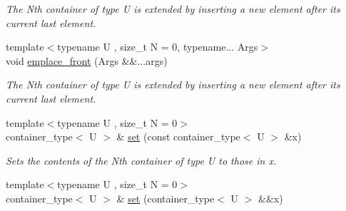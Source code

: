 \begin{DoxyCompactItemize}
\begin{DoxyCompactList}\small\item\em The Nth container of type U is extended by inserting a new element after its current last element. \end{DoxyCompactList}\item 
\hypertarget{classheterogeneous_1_1heterodeque_3_01_t_00_01_types_8_8_8_4_ac23d7efd5678583441800bb516d9db53}{}{\footnotesize template$<$typename U , size\+\_\+t N = 0, typename... Args$>$ }\\void \hyperlink{classheterogeneous_1_1heterodeque_3_01_t_00_01_types_8_8_8_4_ac23d7efd5678583441800bb516d9db53}{emplace\+\_\+front} (Args \&\&...args)\label{classheterogeneous_1_1heterodeque_3_01_t_00_01_types_8_8_8_4_ac23d7efd5678583441800bb516d9db53}

\begin{DoxyCompactList}\small\item\em The Nth container of type U is extended by inserting a new element after its current last element. \end{DoxyCompactList}\item 
\hypertarget{classheterogeneous_1_1heterodeque_3_01_t_00_01_types_8_8_8_4_aa7d6d0f4a15a6f2a9d302b8e7727cf3a}{}{\footnotesize template$<$typename U , size\+\_\+t N = 0$>$ }\\container\+\_\+type$<$ U $>$ \& \hyperlink{classheterogeneous_1_1heterodeque_3_01_t_00_01_types_8_8_8_4_aa7d6d0f4a15a6f2a9d302b8e7727cf3a}{set} (const container\+\_\+type$<$ U $>$ \&x)\label{classheterogeneous_1_1heterodeque_3_01_t_00_01_types_8_8_8_4_aa7d6d0f4a15a6f2a9d302b8e7727cf3a}

\begin{DoxyCompactList}\small\item\em Sets the contents of the Nth container of type U to those in x. \end{DoxyCompactList}\item 
\hypertarget{classheterogeneous_1_1heterodeque_3_01_t_00_01_types_8_8_8_4_ac96baf84dc82c91c304992d4e3cb8bc0}{}{\footnotesize template$<$typename U , size\+\_\+t N = 0$>$ }\\container\+\_\+type$<$ U $>$ \& \hyperlink{classheterogeneous_1_1heterodeque_3_01_t_00_01_types_8_8_8_4_ac96baf84dc82c91c304992d4e3cb8bc0}{set} (container\+\_\+type$<$ U $>$ \&\&x)\label{classheterogeneous_1_1heterodeque_3_01_t_00_01_types_8_8_8_4_ac96baf84dc82c91c304992d4e3cb8bc0}


\end{DoxyCompactItemize}

